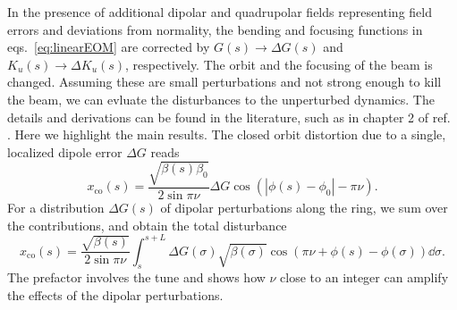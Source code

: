     In the presence of additional dipolar and quadrupolar fields representing field errors and deviations from normality, the bending and focusing functions in eqs.~\eqref{eq:linearEOM} are corrected by $G(s)\to\Delta G(s)$ and $K_u(s)\to\Delta K_u(s)$, respectively. The orbit and the focusing of the beam is changed. Assuming these are small perturbations and not strong enough to kill the beam, we can evluate the disturbances to the unperturbed dynamics. The details and derivations can be found in the literature, such as in chapter 2 of ref. \cite{lee_accelerator_2004}. Here we highlight the main results.  The closed orbit distortion due to a single, localized dipole error $\Delta G$ reads
    \begin{equation}
        x_{\text{co}}(s) = \frac{\sqrt{\beta(s)\beta_0}}{2\sin\pi\nu}\Delta G\cos(|\phi(s)-\phi_0| - \pi\nu).
        \label{eq:cod}
    \end{equation}
    For a distribution $\Delta G(s)$ of dipolar perturbations along the ring, we sum over the contributions, and obtain the total disturbance
    \begin{equation}
        x_{\text{co}}(s) = \frac{\sqrt{\beta(s)}}{2\sin\pi\nu}\int_{s}^{s+L} \Delta G(\sigma)\sqrt{\beta(\sigma)}\cos(\pi\nu + \phi(s) - \phi(\sigma))\dd \sigma.
        \label{eq:cod_dist}
    \end{equation}
    The prefactor involves the tune and shows how $\nu$ close to an integer can amplify the effects of the dipolar perturbations.



